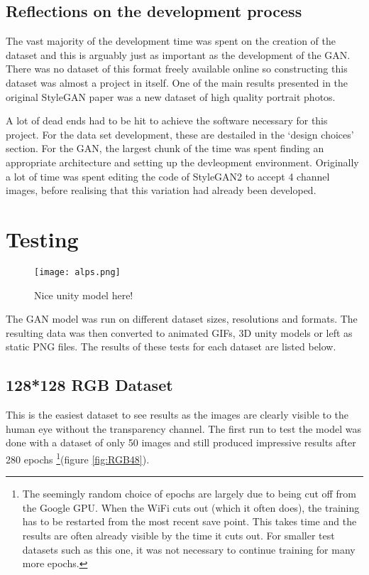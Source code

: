 \documentclass[a4paper]{report}
\begin{document}
\subsection{Reflections on the development process}
The vast majority of the development time was spent on the creation of the dataset and this is arguably just as important as the development of the GAN. There was no dataset of this format freely available online so constructing this dataset was almost a project in itself. One of the main results presented in the original StyleGAN paper \cite{ToDo} was a new dataset of high quality portrait photos.

A lot of dead ends had to be hit to achieve the software necessary for this project. For the data set development, these are destailed in the `design choices' section. For the GAN, the largest chunk of the time was spent finding an appropriate architecture and setting up the devleopment environment. Originally a lot of time was spent editing the code of StyleGAN2 to accept 4 channel images, before realising that this variation had already been developed.
\section{Testing}
\begin{figure}[H]
    \centering
        \texttt{[image: alps.png]}
        \caption{Nice unity model here!}
        \label{fig:ToDo}
\end{figure}

The GAN model was run on different dataset sizes, resolutions and formats. The resulting data was then converted to animated GIFs, 3D unity models or left as static PNG files. The results of these tests for each dataset are listed below.

\subsection{128*128 RGB Dataset}

This is the easiest dataset to see results as the images are clearly visible to the human eye without the transparency channel. The first run to test the model was done with a dataset of only 50 images and still produced impressive results after 280 epochs \footnote{The seemingly random choice of epochs are largely due to being cut off from the Google GPU. When the WiFi cuts out (which it often does), the training has to be restarted from the most recent save point. This takes time and the results are often already visible by the time it cuts out. For smaller test datasets such as this one, it was not necessary to continue training for many more epochs.}(figure \ref{fig:RGB48}).
\end{document}
